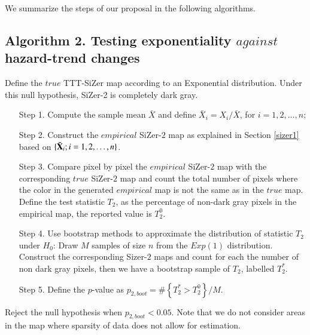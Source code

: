 \documentclass[preprint,12pt]{elsarticle}
\begin{document}
We summarize the steps of our proposal in the following algorithms. 

\subsection*{Algorithm 2. Testing exponentiality $against$ hazard-trend changes} 
Define the $true$ TTT-SiZer map according to an Exponential distribution. Under this null hypothesis, SiZer-2 is completely dark gray. 
\begin{enumerate}
\item[Step 1.] Compute the sample mean $\bar{X}$ and define $\bar{X}_i=X_i/\bar{X}$, for $ i=1,2,\ldots,n$;

\item[Step 2.] Construct the $empirical$ SiZer-$2$ map as explained in Section \ref{sizer1} based on  $\{\bar{\bf X}_i; i=1, 2,\ldots, n \}$.
\item[Step 3.] Compare pixel by pixel the $empirical$ SiZer-$2$ map with the corresponding $true$ SiZer-$2$ map and count the total number of pixels where the color in the generated $empirical$ map is not the same as in the $true$ map. Define the test statistic $T_2$, as the percentage of non-dark gray pixels in the empirical map, the reported value is $T_2^0$.

\item[Step 4.] Use bootstrap methods to approximate the distribution of statistic $T_2$ under $H_0$: Draw $M$ samples of size $n$ from the $Exp(1)$ distribution. Construct the corresponding Sizer-$2$ maps and count for each the number of non dark gray pixels, then we have a bootstrap sample of $T_2$, labelled $T^*_2$.

\item[Step 5.] Define the $p$-value as $p_{2,boot}=\#\left\{T^*_2 > T_2^0\right\}/M$.
\end{enumerate}
Reject the null hypothesis when $p_{2,boot} < 0.05$. Note that we do not consider areas in the map where sparsity of data does not allow for estimation. 


\end{document}
